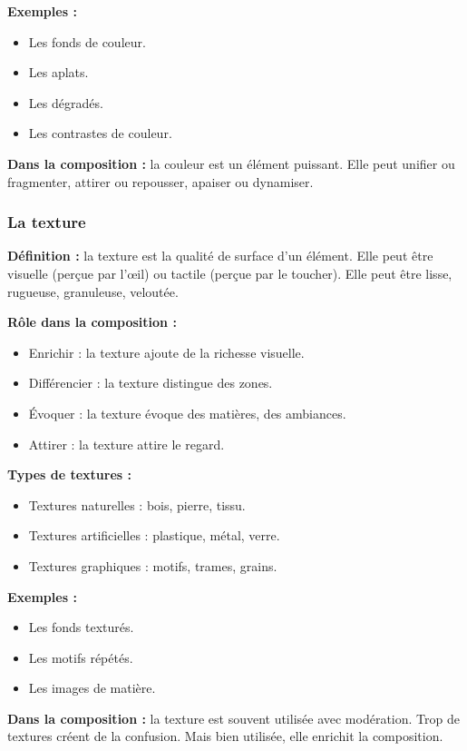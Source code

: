 \textbf{Exemples :}
\begin{itemize}
  \item Les fonds de couleur.
  \item Les aplats.
  \item Les dégradés.
  \item Les contrastes de couleur.
\end{itemize}

\textbf{Dans la composition :} la couleur est un élément puissant. Elle peut unifier ou fragmenter, attirer ou repousser, apaiser ou dynamiser.

\subsubsection{La texture}

\textbf{Définition :} la texture est la qualité de surface d'un élément. Elle peut être visuelle (perçue par l'œil) ou tactile (perçue par le toucher). Elle peut être lisse, rugueuse, granuleuse, veloutée.

\textbf{Rôle dans la composition :}
\begin{itemize}
  \item Enrichir : la texture ajoute de la richesse visuelle.
  \item Différencier : la texture distingue des zones.
  \item Évoquer : la texture évoque des matières, des ambiances.
  \item Attirer : la texture attire le regard.
\end{itemize}

\textbf{Types de textures :}
\begin{itemize}
  \item Textures naturelles : bois, pierre, tissu.
  \item Textures artificielles : plastique, métal, verre.
  \item Textures graphiques : motifs, trames, grains.
\end{itemize}

\textbf{Exemples :}
\begin{itemize}
  \item Les fonds texturés.
  \item Les motifs répétés.
  \item Les images de matière.
\end{itemize}

\textbf{Dans la composition :} la texture est souvent utilisée avec modération. Trop de textures créent de la confusion. Mais bien utilisée, elle enrichit la composition.

